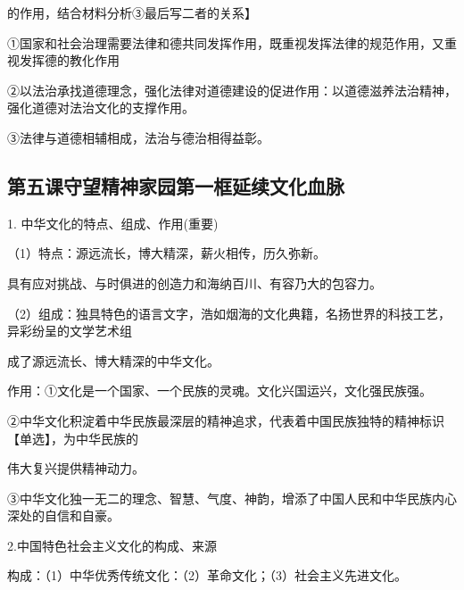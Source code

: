 \documentclass[lang=cn,11pt]{elegantbook}
\newcommand{\daofasym}[1]{{\daofasymbolfont #1}}
\newcommand{\daofasym}[1]{#1}
\begin{document}
的作用，结合材料分析\daofasym{③}最后写二者的关系】\par

\daofasym{①}国家和社会治理需要法律和德共同发挥作用，既重视发挥法律的规范作用，又重视发挥德的教化作用\par

\daofasym{②}以法治承找道德理念，强化法律对道德建设的促进作用：以道德滋养法治精神，强化道德对法治文化的支撑作用。\par

\daofasym{③}法律与道德相辅相成，法治与德治相得益彰。\par

\subsection*{第五课守望精神家园第一框延续文化血脉}

1. 中华文化的特点、组成、作用(重要)\par

（1）特点：源远流长，博大精深，薪火相传，历久弥新。\par

具有应对挑战、与时俱进的创造力和海纳百川、有容乃大的包容力。\par

（2）组成：独具特色的语言文字，浩如烟海的文化典籍，名扬世界的科技工艺，异彩纷呈的文学艺术组\par

成了源远流长、博大精深的中华文化。\par

作用：\daofasym{①}文化是一个国家、一个民族的灵魂。文化兴国运兴，文化强民族强。\par

\daofasym{②}中华文化积淀着中华民族最深层的精神追求，代表着中国民族独特的精神标识【单选】，为中华民族的\par

伟大复兴提供精神动力。\par

\daofasym{③}中华文化独一无二的理念、智慧、气度、神韵，增添了中国人民和中华民族内心深处的自信和自豪。\par

2.中国特色社会主义文化的构成、来源\par

构成：（1）中华优秀传统文化：（2）革命文化；（3）社会主义先进文化。\par
\end{document}

